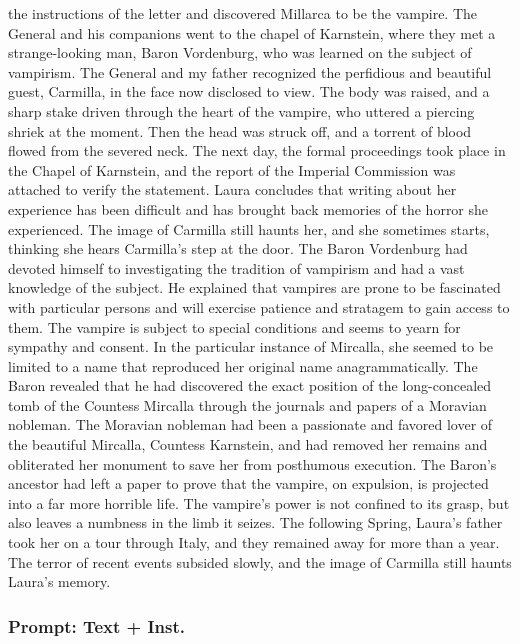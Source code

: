 \documentclass{article} %
\begin{document}
the instructions of the letter and discovered Millarca to be the vampire. The General and his companions went to the chapel of Karnstein, where they met a strange-looking man, Baron Vordenburg, who was learned on the subject of vampirism. The General and my father recognized the perfidious and beautiful guest, Carmilla, in the face now disclosed to view. The body was raised, and a sharp stake driven through the heart of the vampire, who uttered a piercing shriek at the moment. Then the head was struck off, and a torrent of blood flowed from the severed neck. The next day, the formal proceedings took place in the Chapel of Karnstein, and the report of the Imperial Commission was attached to verify the statement. Laura concludes that writing about her experience has been difficult and has brought back memories of the horror she experienced. The image of Carmilla still haunts her, and she sometimes starts, thinking she hears Carmilla's step at the door. The Baron Vordenburg had devoted himself to investigating the tradition of vampirism and had a vast knowledge of the subject. He explained that vampires are prone to be fascinated with particular persons and will exercise patience and stratagem to gain access to them. The vampire is subject to special conditions and seems to yearn for sympathy and consent. In the particular instance of Mircalla, she seemed to be limited to a name that reproduced her original name anagrammatically. The Baron revealed that he had discovered the exact position of the long-concealed tomb of the Countess Mircalla through the journals and papers of a Moravian nobleman. The Moravian nobleman had been a passionate and favored lover of the beautiful Mircalla, Countess Karnstein, and had removed her remains and obliterated her monument to save her from posthumous execution. The Baron's ancestor had left a paper to prove that the vampire, on expulsion, is projected into a far more horrible life. The vampire's power is not confined to its grasp, but also leaves a numbness in the limb it seizes. The following Spring, Laura's father took her on a tour through Italy, and they remained away for more than a year. The terror of recent events subsided slowly, and the image of Carmilla still haunts Laura's memory.

\subsubsection{Prompt: Text + Inst.}
\end{document}
